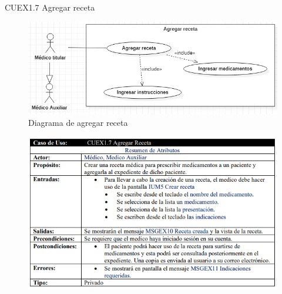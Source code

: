 \documentclass[12pt,letterpaper]{article}
\begin{document}
            \newpage
            CUEX1.7 Agregar receta
            \begin{figure}[H]
                \centering
                \includegraphics [scale=0.5]{casosUso/agregarReceta}
                \caption{Diagrama de agregar receta}
            \end{figure}
            \begin{figure}[H]
                \centering
                \includegraphics [scale=0.8]{specs/specAgregarReceta}
            \end{figure}
\end{document}
